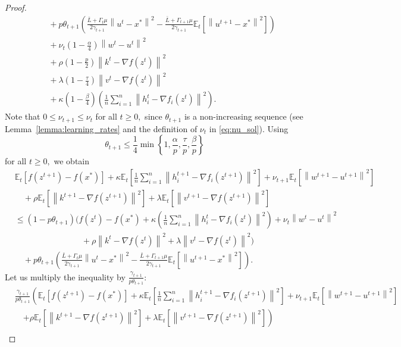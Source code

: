 \documentclass{article} %
\newcommand{\norm}[1]{\left\| #1 \right\|}
\newcommand{\ExpSub}[2]{{\mathbb{E}}_{#1}\left[#2\right]}
\theoremstyle{plain}
\theoremstyle{definition}
\theoremstyle{remark}
\begin{document}
\begin{proof}
\begin{align*}
    &\quad+ p\theta_{t+1} \left(\frac{\bar{L} + \Gamma_{t} \mu}{2 \gamma_{t+1}} \norm{u^t - x^*}^2 - \frac{\bar{L} + \Gamma_{t+1} \mu}{2 \gamma_{t+1}} \ExpSub{t}{\norm{u^{t+1} - x^*}^2}\right) \\
    &\quad + \nu_{t} \left(1 - \frac{\alpha}{4}\right) \norm{w^t - u^t}^2 \\
    &\quad + \rho \left(1 - \frac{p}{2}\right) \norm{k^{t} - \nabla f(z^t)}^2 \\
    &\quad + \lambda \left(1 - \frac{\tau}{4}\right) \norm{v^{t} - \nabla f(z^t)}^2 \\
    &\quad + \kappa \left(1 - \frac{\beta}{4}\right) \left(\frac{1}{n}\sum_{i=1}^n \norm{h_i^t - \nabla f_i(z^{t})}^2\right).
  \end{align*}
  Note that $0 \leq \nu_{t+1} \leq \nu_{t}$ for all $t \geq 0,$ since $\theta_{t+1}$ is a non-increasing sequence (see Lemma~\ref{lemma:learning_rates} and the definition of $\nu_{t}$ in \eqref{eq:nu_sol}). Using 
  $$\theta_{t+1} \leq \frac{1}{4}\min\left\{1, \frac{\alpha}{p}, \frac{\tau}{p}, \frac{\beta}{p}\right\}$$ for all $t \geq 0,$ we obtain
  \begin{align*}
    &\ExpSub{t}{f(z^{t+1}) - f(x^*)} + \kappa \ExpSub{t}{\frac{1}{n}\sum_{i=1}^n \norm{h_i^{t+1} - \nabla f_i(z^{t+1})}^2} + \nu_{t+1} \ExpSub{t}{\norm{w^{t+1} - u^{t+1}}^2}\\
    &\quad  + \rho \ExpSub{t}{\norm{k^{t+1} - \nabla f(z^{t+1})}^2} + \lambda \ExpSub{t}{\norm{v^{t+1} - \nabla f(z^{t+1})}^2}\\
    &\leq (1 - p\theta_{t+1}) \Bigg( f(z^{t}) - f(x^*) + \kappa \left(\frac{1}{n}\sum_{i=1}^n \norm{h_i^t - \nabla f_i(z^{t})}^2\right)  + \nu_{t} \norm{w^t - u^t}^2 \\
    &\qquad\qquad\qquad\qquad + \rho \norm{k^{t} - \nabla f(z^t)}^2 + \lambda \norm{v^{t} - \nabla f(z^t)}^2 \Bigg)\\
    &\quad+ p\theta_{t+1} \left(\frac{\bar{L} + \Gamma_{t} \mu}{2 \gamma_{t+1}} \norm{u^t - x^*}^2 - \frac{\bar{L} + \Gamma_{t+1} \mu}{2 \gamma_{t+1}} \ExpSub{t}{\norm{u^{t+1} - x^*}^2}\right).
  \end{align*}
  Let us multiply the inequality by $\frac{\gamma_{t+1}}{p\theta_{t+1}}:$
  \begin{align*}
    &\frac{\gamma_{t+1}}{p\theta_{t+1}}\left(\ExpSub{t}{f(z^{t+1}) - f(x^*)} + \kappa \ExpSub{t}{\frac{1}{n}\sum_{i=1}^n \norm{h_i^{t+1} - \nabla f_i(z^{t+1})}^2} + \nu_{t+1} \ExpSub{t}{\norm{w^{t+1} - u^{t+1}}^2}\right.\\
    &\quad  \left.+ \rho \ExpSub{t}{\norm{k^{t+1} - \nabla f(z^{t+1})}^2} + \lambda \ExpSub{t}{\norm{v^{t+1} - \nabla f(z^{t+1})}^2}\right)\\

\end{align*}
\end{proof}
\end{document}
